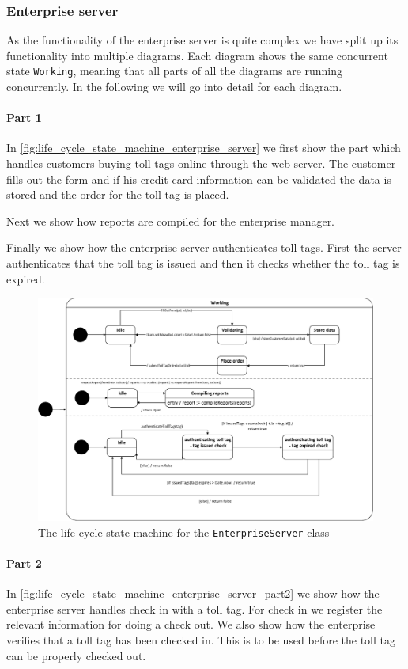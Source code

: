 \subsubsection*{Enterprise server}
As the functionality of the enterprise server is quite complex we have split up its functionality into multiple diagrams. Each diagram shows the same concurrent state \texttt{Working}, meaning that all parts of all the diagrams are running concurrently. In the following we will go into detail for each diagram.

\paragraph*{Part 1} In \autoref{fig:life_cycle_state_machine_enterprise_server} we first show the part which handles customers buying toll tags online through the web server. The customer fills out the form and if his credit card information can be validated the data is stored and the order for the toll tag is placed.

Next we show how reports are compiled for the enterprise manager.

Finally we show how the enterprise server authenticates toll tags. First the server authenticates that the toll tag is issued and then it checks  whether the toll tag is expired.

\begin{figure}[H]
\centering
\includegraphics[width=0.7\linewidth]{img/behaviour_state_machines/life_cycle_state_machines/life_cycle_state_machine_enterprise_server}
\caption{The life cycle state machine for the \texttt{EnterpriseServer} class}
\label{fig:life_cycle_state_machine_enterprise_server}
\end{figure}

\paragraph*{Part 2} In \autoref{fig:life_cycle_state_machine_enterprise_server_part2} we show how the enterprise server handles check in with a toll tag. For check in we register the relevant information for doing a check out. We also show how the enterprise verifies that a toll tag has been checked in. This is to be used before the toll tag can be properly checked out.

